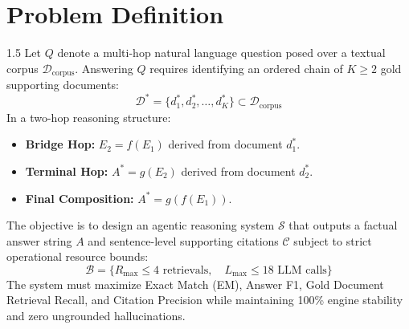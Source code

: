 \documentclass[12pt,a4paper]{report}
\begin{document}
\section{Problem Definition}
\begin{spacing}{1.5}
Let $Q$ denote a multi-hop natural language question posed over a textual corpus $\mathcal{D}_{\text{corpus}}$. Answering $Q$ requires identifying an ordered chain of $K \ge 2$ gold supporting documents:
\begin{equation}
\mathcal{D}^* = \{d_1^*, d_2^*, \dots, d_K^*\} \subset \mathcal{D}_{\text{corpus}}
\end{equation}
In a two-hop reasoning structure:
\begin{itemize}
    \item \textbf{Bridge Hop:} $E_2 = f(E_1)$ derived from document $d_1^*$.
    \item \textbf{Terminal Hop:} $A^* = g(E_2)$ derived from document $d_2^*$.
    \item \textbf{Final Composition:} $A^* = g(f(E_1))$.
\end{itemize}

The objective is to design an agentic reasoning system $\mathcal{S}$ that outputs a factual answer string $A$ and sentence-level supporting citations $\mathcal{C}$ subject to strict operational resource bounds:
\begin{equation}
\mathcal{B} = \{ R_{\max} \le 4 \text{ retrievals}, \quad L_{\max} \le 18 \text{ LLM calls} \}
\end{equation}
The system must maximize Exact Match (EM), Answer F1, Gold Document Retrieval Recall, and Citation Precision while maintaining 100\% engine stability and zero ungrounded hallucinations.
\end{spacing}
\end{document}
